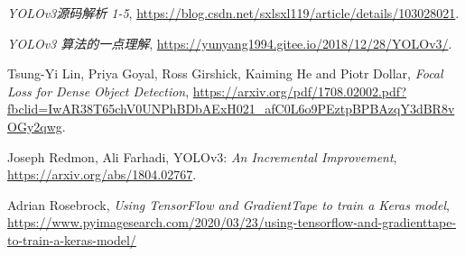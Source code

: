 \documentclass[10pt,a4paper]{article}
\begin{document}
\begin{thebibliography}{9}
    \textit{YOLOv3源码解析 1-5}, \url{https://blog.csdn.net/sxlsxl119/article/details/103028021}.

    \textit{YOLOv3 算法的一点理解}, \url{https://yunyang1994.gitee.io/2018/12/28/YOLOv3/}.

     Tsung-Yi Lin, Priya Goyal, Ross Girshick, Kaiming He and  Piotr Dollar, \textit{Focal Loss for Dense Object Detection}, \url{https://arxiv.org/pdf/1708.02002.pdf?fbclid=IwAR38T65chV0UNPhBDbAExH021_afC0L6o9PEztpBPBAzqY3dBR8vOGy2qwg}. 

     Joseph Redmon, Ali Farhadi, YOLOv3: \textit{An Incremental Improvement}, \url{https://arxiv.org/abs/1804.02767}.
    
     Adrian Rosebrock, \textit{Using TensorFlow and GradientTape to train a Keras model}, \url{https://www.pyimagesearch.com/2020/03/23/using-tensorflow-and-gradienttape-to-train-a-keras-model/}
\end{thebibliography}
\end{document}
